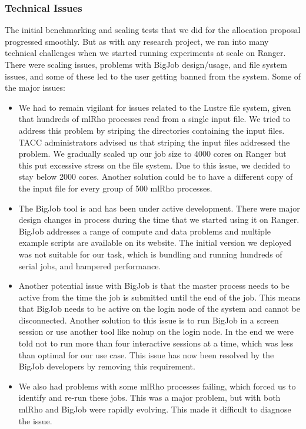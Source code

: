 \documentclass{sig-alternate}
\begin{document}
\subsubsection{Technical Issues }

The initial benchmarking and scaling tests that we did for the allocation proposal progressed smoothly. But as with any research project, we ran into many technical challenges when we started running experiments at scale on Ranger. There were scaling issues, problems with BigJob design/usage, and file system issues, and some of these led to the user getting banned from the system. Some of the major issues:
\begin{itemize}
\item We had to remain vigilant for issues related to the Lustre file system, given that hundreds of mlRho
  processes read from a single input file. We tried to address this problem by striping the directories
  containing the input files. TACC administrators advised us that striping the input files addressed the
  problem. We gradually scaled up our job size to 4000 cores on Ranger but this put excessive stress on the
  file system. Due to this issue, we decided to stay below 2000 cores. Another solution could be to have a
  different copy of the input file for every group of 500 mlRho processes.
\item The BigJob tool is and has been under active development. There were major design changes in process
  during the time that we started using it on Ranger. BigJob addresses a range of compute and data problems
  and multiple example scripts are available on its website. The initial version we deployed was not suitable for
  our task, which is bundling and running hundreds of serial jobs, and hampered performance. 
\item Another potential issue with BigJob is that the master process needs to be active from the time the job
  is submitted until the end of the job. This means that BigJob needs to be active on the login node of the
  system and cannot be disconnected. Another solution to this issue is to run BigJob in a screen session or use another
  tool like nohup on the login node. In the end we were told not to run more than four interactive sessions at a time, which was less than optimal for our use case. This issue has now been resolved by the BigJob developers by removing this requirement.
\item We also had problems with some mlRho processes failing, which forced us to identify and re-run
  these jobs. This was a major problem, but with both mlRho and BigJob were rapidly evolving. This made it difficult to diagnose the issue.

\end{itemize}
\end{document}
